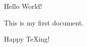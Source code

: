 \documentclass{article}
\begin{document}
Hello World!

This is my first document.

Happy \TeX ing!
\end{document}
